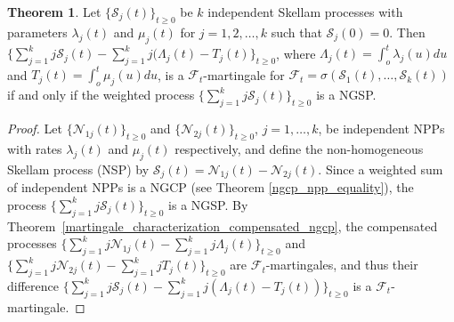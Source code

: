 \documentclass[11pt,oneside,reqno]{amsart}
\theoremstyle{definition}
\newtheorem{theorem}{\bf Theorem}[section]
\theoremstyle{remarkstyle}
\begin{document}
\begin{theorem}\label{Watanabe_characterization_NGSP}
Let $\{\mathcal{S}_j(t)\}_{t\ge 0}$ be $k$ independent Skellam processes with parameters $\lambda_j(t)$ and $\mu_j(t)$ for $j=1,2,\dots,k$ such that $\mathcal{S}_j(0)=0$. Then $\{\sum_{j=1}^{k}j\mathcal{S}_j(t)-\sum_{j=1}^{k}j(\Lambda_j(t)-T_j(t)\}_{t\ge 0}$, where $\Lambda_j(t)=\int_{o}^{t}\lambda_j(u)du$ and $T_j(t)=\int_{o}^{t}\mu_j(u)du$, is a $\mathcal{F}_t$-martingale for $\mathcal{F}_t=\sigma(\mathcal{S}_1(t),\dots,\mathcal{S}_k(t))$ if and only if the weighted process $\{\sum_{j=1}^{k}j\mathcal{S}_j(t)\}_{t\ge 0}$ is a NGSP.
\end{theorem}
\begin{proof}
Let $\{\mathcal{N}_{1j}(t)\}_{t\ge 0}$ and $\{\mathcal{N}_{2j}(t)\}_{t\ge 0}$, $j=1,\dots,k$, be independent NPPs with rates $\lambda_j(t)$ and $\mu_j(t)$ respectively, and define the non-homogeneous Skellam process (NSP) by $\mathcal{S}_j(t)=\mathcal{N}_{1j}(t)-\mathcal{N}_{2j}(t)$. Since a weighted sum of independent NPPs is a NGCP (see Theorem \ref{ngcp_npp_equality}), the process $\{\sum_{j=1}^{k}j\mathcal{S}_j(t)\}_{t\ge 0}$ is a NGSP. By Theorem~\ref{martingale_characterization_compensated_ngcp}, the compensated processes $\{\sum_{j=1}^{k}j\mathcal{N}_{1j}(t)-\sum_{j=1}^{k}j\Lambda_j(t)\}_{t\ge 0}$ and $\{\sum_{j=1}^{k}j\mathcal{N}_{2j}(t)-\sum_{j=1}^{k}jT_j(t)\}_{t\ge 0}$ are $\mathcal{F}_t$-martingales, and thus their difference $\{\sum_{j=1}^k j\mathcal{S}_j(t)-\sum_{j=1}^k j(\Lambda_j(t)-T_j(t))\}_{t\ge 0}$ is a $\mathcal{F}_t$-martingale. 


\end{proof}
\end{document}
